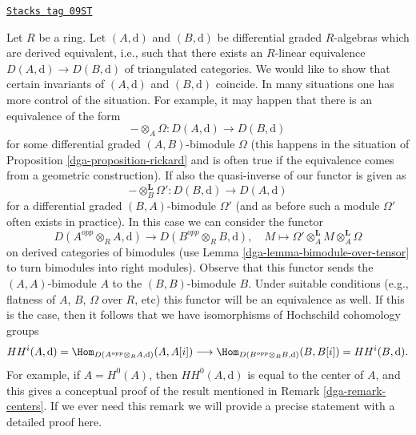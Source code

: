 \begin{remark}
\label{dga-remark-hochschild-cohomology}
\href{https://stacks.math.columbia.edu/tag/09ST}{\texttt{Stacks tag 09ST}}

Let $R$ be a ring. Let $(A, \text{d})$ and $(B, \text{d})$ be differential
graded $R$-algebras which are derived equivalent, i.e., such that there
exists an $R$-linear equivalence $D(A, \text{d}) \to D(B, \text{d})$
of triangulated categories. We would like to show that certain invariants
of $(A, \text{d})$ and $(B, \text{d})$ coincide. In many situations
one has more control of the situation. For example, it may happen
that there is an equivalence of the form
$$
- \otimes_A \Omega : D(A, \text{d}) \longrightarrow D(B, \text{d})
$$
for some differential graded $(A, B)$-bimodule
$\Omega$ (this happens in the situation of
Proposition \ref{dga-proposition-rickard} and is often true
if the equivalence comes from a geometric construction).
If also the quasi-inverse of our functor is given as
$$
- \otimes_B^\mathbf{L} \Omega' : D(B, \text{d}) \longrightarrow D(A, \text{d})
$$
for a differential graded $(B, A)$-bimodule $\Omega'$
(and as before such a module $\Omega'$ often exists in practice).
In this case we can consider the functor
$$
D(A^{opp} \otimes_R A, \text{d})
\longrightarrow
D(B^{opp} \otimes_R B, \text{d}),\quad
M \longmapsto \Omega' \otimes^\mathbf{L}_A M \otimes_A^\mathbf{L} \Omega
$$
on derived categories of bimodules (use
Lemma \ref{dga-lemma-bimodule-over-tensor} to turn bimodules into
right modules).
Observe that this functor sends the $(A, A)$-bimodule $A$ to
the $(B, B)$-bimodule $B$. Under suitable conditions
(e.g., flatness of $A$, $B$, $\Omega$ over $R$, etc)
this functor will be an equivalence as well.
If this is the case, then it follows that we have isomorphisms
of Hochschild cohomology groups
$$
HH^i(A, \text{d}) =
\Hom_{D(A^{opp} \otimes_R A, \text{d})}(A, A[i])
\longrightarrow
\Hom_{D(B^{opp} \otimes_R B, \text{d})}(B, B[i]) =
HH^i(B, \text{d}).
$$
For example, if $A = H^0(A)$, then $HH^0(A, \text{d})$
is equal to the center of $A$, and this gives a conceptual proof
of the result mentioned in Remark \ref{dga-remark-centers}.
If we ever need this remark we will provide a precise statement
with a detailed proof here.
\end{remark}

